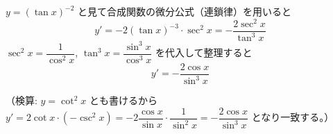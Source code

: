 
$y = (\tan x)^{-2}$ と見て合成関数の微分公式（連鎖律）を用いると
\[
y' = -2(\tan x)^{-3}\cdot \sec^{2}x
= -\frac{2\sec^{2}x}{\tan^{3}x}
\]
$\sec^{2}x = \dfrac{1}{\cos^{2}x}$, $\tan^{3}x = \dfrac{\sin^{3}x}{\cos^{3}x}$ を代入して整理すると
\[
\boxed{\; y' = -\dfrac{2\cos x}{\sin^{3} x} \;}
\]

（検算: $y=\cot^{2}x$ とも書けるから $y' = 2\cot x\cdot(-\csc^{2}x) = -2\dfrac{\cos x}{\sin x}\cdot\dfrac{1}{\sin^{2}x} = -\dfrac{2\cos x}{\sin^{3}x}$ となり一致する。）
